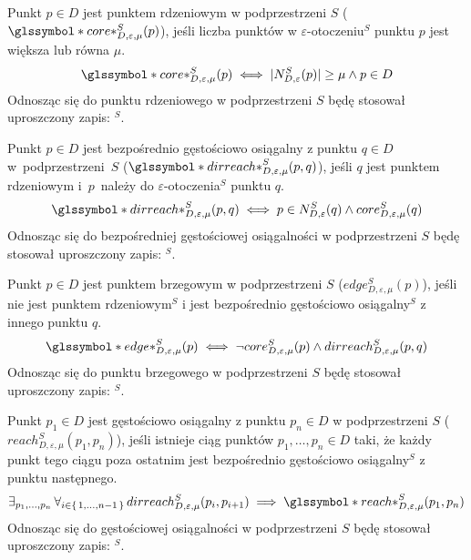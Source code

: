 \newline
Punkt $ p \in D $ jest punktem rdzeniowym w podprzestrzeni $ S $ ($ \s{core*}^S_{D,\varepsilon,\mu}(p) $), jeśli liczba punktów w $ \varepsilon $-otoczeniu$^S $ punktu $ p $ jest większa lub równa $ \mu $.
\begin{equation}
	\s{core*}^S_{D,\varepsilon,\mu}(p) \iff |N^S_{D,\varepsilon}(p)| \ge \mu \land p\in D
\end{equation}
Odnosząc się do punktu rdzeniowego w podprzestrzeni $ S $ będę stosował uproszczony zapis: \textit{$^S$}.
\smallskip

 \newline
Punkt $ p\in D $ jest bezpośrednio gęstościowo osiągalny z punktu $ q\in D $ \mbox{w podprzestrzeni $ S $} ($ \s{dirreach*}^S_{D,\varepsilon,\mu}(p, q) $), jeśli $ q $ jest punktem rdzeniowym \mbox{i $ p $ należy} do $ \varepsilon $-otoczenia$^S$ punktu $ q $.
\begin{equation}
	\s{dirreach*}^S_{D,\varepsilon,\mu}(p, q) \iff p \in N^S_{D,\varepsilon}(q) \land core^S_{D,\varepsilon,\mu}(q)
\end{equation}
Odnosząc się do bezpośredniej gęstościowej osiągalności w podprzestrzeni $ S $ będę stosował uproszczony zapis: \textit{$^S$}.
\smallskip

 \newline
Punkt $ p\in D $ jest punktem brzegowym w podprzestrzeni $ S $ ($ edge^S_{D,\varepsilon,\mu}(p) $), jeśli nie jest punktem rdzeniowym$^S$ i jest bezpośrednio gęstościowo osiągalny$^S$ z innego punktu $ q $.
\begin{equation}
	\s{edge*}^S_{D,\varepsilon,\mu}(p) \iff \neg core^S_{D,\varepsilon,\mu}(p) \land dirreach^S_{D,\varepsilon,\mu}(p,q)
\end{equation}
Odnosząc się do punktu brzegowego w podprzestrzeni $ S $ będę stosował uproszczony zapis: \textit{ $^S$}.
\smallskip

 \newline
Punkt $ p_1\in D $ jest gęstościowo osiągalny z punktu $ p_n\in D $ w podprzestrzeni $ S $ \linebreak($ reach^S_{D,\varepsilon,\mu}(p_1, p_n) $), jeśli istnieje ciąg punktów $ p_1,\dots,p_n \in D $ taki, że każdy punkt tego ciągu poza ostatnim jest bezpośrednio gęstościowo osiągalny$^S$ z punktu następnego.
\begin{equation}
	\exists_{p_1,\dots,p_n}\,\forall_{i\in\set{1,\dots,n-1}}\,dirreach^S_{D,\varepsilon,\mu}(p_i, p_{i+1}) \implies \s{reach*}^S_{D,\varepsilon,\mu}(p_1, p_n)	 
\end{equation}
Odnosząc się do gęstościowej osiągalności w podprzestrzeni $ S $ będę stosował uproszczony zapis: \textit{ $^S$}.
\smallskip

